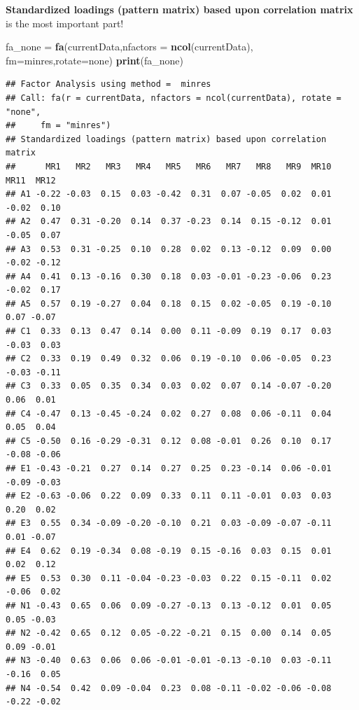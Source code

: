 \documentclass[
]{ctexart}
\newenvironment{Shaded}{\begin{snugshade}}{\end{snugshade}}
\newcommand{\AttributeTok}[1]{\textcolor[rgb]{0.13,0.29,0.53}{#1}}
\newcommand{\FunctionTok}[1]{\textcolor[rgb]{0.13,0.29,0.53}{\textbf{#1}}}
\newcommand{\NormalTok}[1]{#1}
\newcommand{\OtherTok}[1]{\textcolor[rgb]{0.56,0.35,0.01}{#1}}
\newcommand{\StringTok}[1]{\textcolor[rgb]{0.31,0.60,0.02}{#1}}
\begin{document}
\textbf{Standardized loadings (pattern matrix) based upon correlation
matrix} is the most important part!

\begin{Shaded}
\begin{Highlighting}[]
\NormalTok{fa\_none }\OtherTok{=} \FunctionTok{fa}\NormalTok{(currentData,}\AttributeTok{nfactors =} \FunctionTok{ncol}\NormalTok{(currentData),}
             \AttributeTok{fm=}\StringTok{\textquotesingle{}minres\textquotesingle{}}\NormalTok{,}\AttributeTok{rotate=}\StringTok{\textquotesingle{}none\textquotesingle{}}\NormalTok{)  }
\FunctionTok{print}\NormalTok{(fa\_none)}
\end{Highlighting}
\end{Shaded}

\begin{verbatim}
## Factor Analysis using method =  minres
## Call: fa(r = currentData, nfactors = ncol(currentData), rotate = "none", 
##     fm = "minres")
## Standardized loadings (pattern matrix) based upon correlation matrix
##      MR1   MR2   MR3   MR4   MR5   MR6   MR7   MR8   MR9  MR10  MR11  MR12
## A1 -0.22 -0.03  0.15  0.03 -0.42  0.31  0.07 -0.05  0.02  0.01 -0.02  0.10
## A2  0.47  0.31 -0.20  0.14  0.37 -0.23  0.14  0.15 -0.12  0.01 -0.05  0.07
## A3  0.53  0.31 -0.25  0.10  0.28  0.02  0.13 -0.12  0.09  0.00 -0.02 -0.12
## A4  0.41  0.13 -0.16  0.30  0.18  0.03 -0.01 -0.23 -0.06  0.23 -0.02  0.17
## A5  0.57  0.19 -0.27  0.04  0.18  0.15  0.02 -0.05  0.19 -0.10  0.07 -0.07
## C1  0.33  0.13  0.47  0.14  0.00  0.11 -0.09  0.19  0.17  0.03 -0.03  0.03
## C2  0.33  0.19  0.49  0.32  0.06  0.19 -0.10  0.06 -0.05  0.23 -0.03 -0.11
## C3  0.33  0.05  0.35  0.34  0.03  0.02  0.07  0.14 -0.07 -0.20  0.06  0.01
## C4 -0.47  0.13 -0.45 -0.24  0.02  0.27  0.08  0.06 -0.11  0.04  0.05  0.04
## C5 -0.50  0.16 -0.29 -0.31  0.12  0.08 -0.01  0.26  0.10  0.17 -0.08 -0.06
## E1 -0.43 -0.21  0.27  0.14  0.27  0.25  0.23 -0.14  0.06 -0.01 -0.09 -0.03
## E2 -0.63 -0.06  0.22  0.09  0.33  0.11  0.11 -0.01  0.03  0.03  0.20  0.02
## E3  0.55  0.34 -0.09 -0.20 -0.10  0.21  0.03 -0.09 -0.07 -0.11  0.01 -0.07
## E4  0.62  0.19 -0.34  0.08 -0.19  0.15 -0.16  0.03  0.15  0.01  0.02  0.12
## E5  0.53  0.30  0.11 -0.04 -0.23 -0.03  0.22  0.15 -0.11  0.02 -0.06  0.02
## N1 -0.43  0.65  0.06  0.09 -0.27 -0.13  0.13 -0.12  0.01  0.05  0.05 -0.03
## N2 -0.42  0.65  0.12  0.05 -0.22 -0.21  0.15  0.00  0.14  0.05  0.09 -0.01
## N3 -0.40  0.63  0.06  0.06 -0.01 -0.01 -0.13 -0.10  0.03 -0.11 -0.16  0.05
## N4 -0.54  0.42  0.09 -0.04  0.23  0.08 -0.11 -0.02 -0.06 -0.08 -0.22 -0.02

\end{verbatim}
\end{document}
